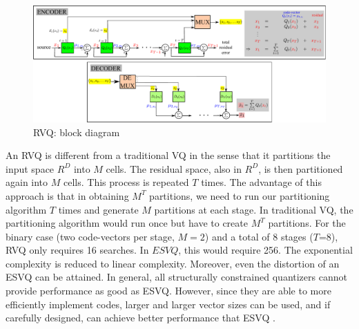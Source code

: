 \begin{figure}				
	\includegraphics[width=1\textwidth]{thesis/RVQ_blockDiagram.pdf}
	\caption{RVQ: block diagram}
	\label{fig:RVQ_block_diagram}
\end{figure}

An RVQ is different from a traditional VQ in the sense that it partitions the input space $R^D$ into $M$ cells.  The residual space, also in $R^D$, is then partitioned again into $M$ cells.  This process is repeated $T$ times.  The advantage of this approach is that in obtaining $M^T$ partitions, we need to run our partitioning algorithm $T$ times and generate $M$ partitions at each stage.  In traditional VQ, the partitioning algorithm would run once but have to create $M^T$ partitions.  For the binary case (two code-vectors per stage, $M=2$) and a total of 8 stages ($T$=8), RVQ only requires 16 searches.  In $ESVQ$, this would require 256.  The exponential complexity is reduced to linear complexity.  Moreover, even the distortion of an ESVQ can be attained.  In general, all structurally constrained quantizers cannot provide performance as good as ESVQ.  However, since they are able to more efficiently implement codes, larger and larger vector sizes can be used, and if carefully designed, can achieve better performance that ESVQ \cite{1996_JNL_AdvancesRVQ_Barnes}.

